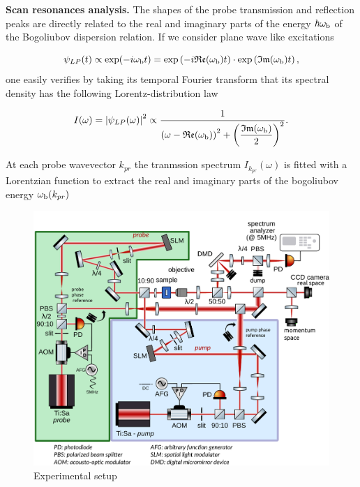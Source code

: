  \textbf{Scan resonances analysis.} The shapes of the probe transmission and reflection peaks are directly related to the real and imaginary parts of the energy $\hbar \omega_{\mathrm{b}}$ of the Bogoliubov dispersion relation.
  If we consider plane wave like excitations

\begin{equation}
    \psi_{LP}(t) \propto \mathrm{exp} (-i \omega_{\mathrm{b}} t) = \mathrm{exp} \left (- i \mathfrak{Re} (\omega_{\mathrm{b}}) t \right ) \cdot \mathrm{exp} \left( \mathfrak{Im} (\omega_{\mathrm{b}}) t \right),
\end{equation}
one easily verifies by taking its temporal Fourier transform that its spectral density has the following Lorentz-distribution law

\begin{equation}
    I(\omega) = \abs{\psi_{LP}(\omega)}^2 \propto \dfrac{1}{ \left(\omega - \mathfrak{Re}(\omega_{\mathrm{b}}) \right)^2 + \left( \dfrac{\mathfrak{Im}(\omega_{\mathrm{b}})}{2} \right)^2}.
\end{equation}

At each probe wavevector $k_{pr}$ the tranmssion spectrum $I_{k_{pr}}(\omega)$ is fitted with a Lorentzian function to extract the real and imaginary parts of the bogoliubov energy $\omega_{\mathrm{b}}(k_{pr})$

 \begin{figure}
    \centering
    \includegraphics[width=1\textwidth]{chap3_custom_st/fig/set_up_spacetime.pdf}
    \caption{Experimental setup}
    \label{fig:setup}
\end{figure}





